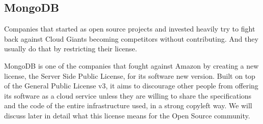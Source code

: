 \documentclass[12pt, a4paper]{article}
\begin{document}
  \subsection{MongoDB}
  Companies that started as open source projects and invested heavily try to fight back against Cloud Giants becoming competitors without contributing. And they usually do that by restricting their license.

  MongoDB is one of the companies that fought against Amazon by creating a new license, the Server Side Public License, for its software new version. Built on top of the General Public License v3, it aims to discourage other people from offering its software as a cloud service unless they are willing to share the specifications and the code of the entire infrastructure used, in a strong copyleft way. We will discuss later in detail what this license means for the Open Source community.
\end{document}
